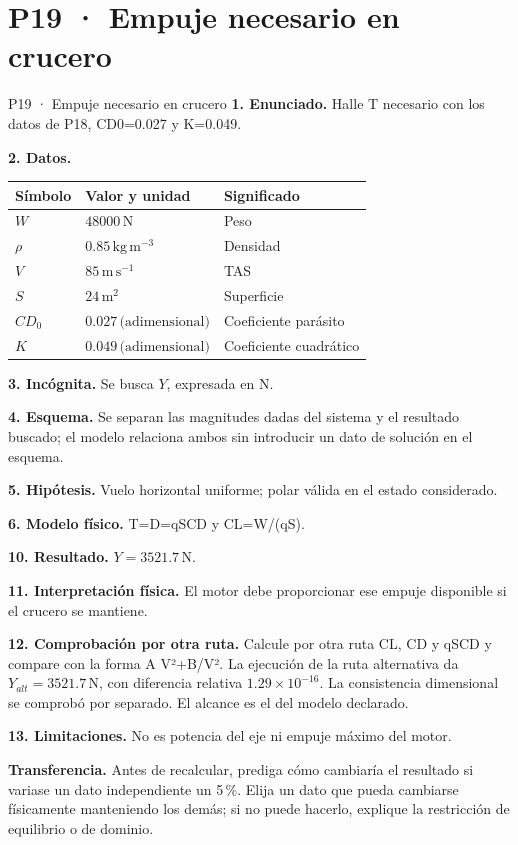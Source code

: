 \chapter*{P19 · Empuje necesario en crucero}
\begin{studiumworked}{P19 · Empuje necesario en crucero}
\textbf{1. Enunciado.} Halle T necesario con los datos de P18, CD0=0.027 y K=0.049.

\textbf{2. Datos.}
\begin{longtable}{p{.16\linewidth}p{.35\linewidth}p{.38\linewidth}}\toprule Símbolo & Valor y unidad & Significado\\\midrule\endhead
$W$ & $48000\,\mathrm N$ & Peso\\
$\rho$ & $0.85\,\mathrm{kg\,m^{-3}}$ & Densidad\\
$V$ & $85\,\mathrm{m\,s^{-1}}$ & TAS\\
$S$ & $24\,\mathrm{m^2}$ & Superficie\\
$CD_{0}$ & $0.027\,\text{(adimensional)}$ & Coeficiente parásito\\
$K$ & $0.049\,\text{(adimensional)}$ & Coeficiente cuadrático\\
\bottomrule\end{longtable}
\textbf{3. Incógnita.} Se busca $Y$, expresada en $\mathrm N$.

\textbf{4. Esquema.} Se separan las magnitudes dadas del sistema y el resultado buscado; el modelo relaciona ambos sin introducir un dato de solución en el esquema.

\textbf{5. Hipótesis.} Vuelo horizontal uniforme; polar válida en el estado considerado.

\textbf{6. Modelo físico.} T=D=qSCD y CL=W/(qS).


\textbf{10. Resultado.} $Y=3521.7\,\mathrm N$.

\textbf{11. Interpretación física.} El motor debe proporcionar ese empuje disponible si el crucero se mantiene.

\textbf{12. Comprobación por otra ruta.} Calcule por otra ruta CL, CD y qSCD y compare con la forma A V²+B/V². La ejecución de la ruta alternativa da $Y_{alt}=3521.7\,\mathrm N$, con diferencia relativa $1.29\times10^{-16}$. La consistencia dimensional se comprobó por separado. El alcance es el del modelo declarado.

\textbf{13. Limitaciones.} No es potencia del eje ni empuje máximo del motor.

\textbf{Transferencia.} Antes de recalcular, prediga cómo cambiaría el resultado si variase un dato independiente un 5\,\%. Elija un dato que pueda cambiarse físicamente manteniendo los demás; si no puede hacerlo, explique la restricción de equilibrio o de dominio.\par
\end{studiumworked}
